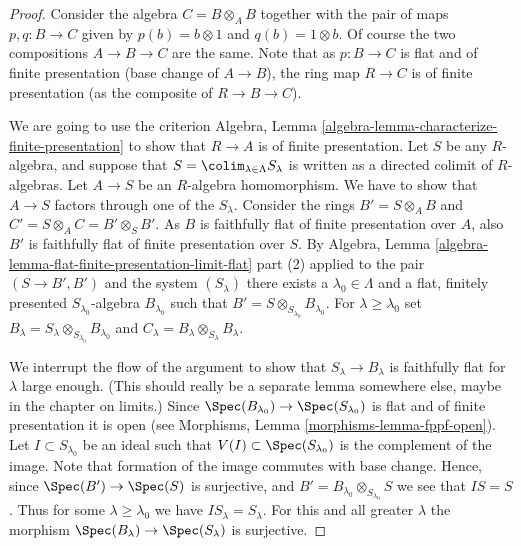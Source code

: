 \begin{proof}
Consider the algebra $C = B \otimes_A B$ together with the
pair of maps $p, q : B \to C$ given by $p(b) = b \otimes 1$
and $q(b) = 1 \otimes b$. Of course the two compositions
$A \to B \to C$ are the same. Note that as
$p : B \to C$ is flat and of finite presentation (base change of
$A \to B$), the ring map $R \to C$ is of finite presentation
(as the composite of $R \to B \to C$).

\medskip\noindent
We are going to use the criterion
Algebra, Lemma \ref{algebra-lemma-characterize-finite-presentation}
to show that $R \to A$ is of finite presentation.
Let $S$ be any $R$-algebra, and suppose that
$S = \colim_{\lambda \in \Lambda} S_\lambda$ is written
as a directed colimit of $R$-algebras.
Let $A \to S$ be an $R$-algebra homomorphism. We have to
show that $A \to S$ factors through one of the $S_\lambda$.
Consider the rings $B' = S \otimes_A B$ and
$C' = S \otimes_A C = B' \otimes_S B'$.
As $B$ is faithfully flat of finite presentation over $A$, also $B'$
is faithfully flat of finite presentation over $S$.
By Algebra, Lemma \ref{algebra-lemma-flat-finite-presentation-limit-flat}
part (2) applied to the pair $(S \to B', B')$ and the system $(S_\lambda)$
there exists a $\lambda_0 \in \Lambda$
and a flat, finitely presented $S_{\lambda_0}$-algebra
$B_{\lambda_0}$ such that $B' = S \otimes_{S_{\lambda_0}} B_{\lambda_0}$.
For $\lambda \geq \lambda_0$ set
$B_\lambda = S_\lambda \otimes_{S_{\lambda_0}} B_{\lambda_0}$ and
$C_\lambda = B_\lambda \otimes_{S_\lambda} B_\lambda$.

\medskip\noindent
We interrupt the flow of the argument to show that $S_\lambda \to B_\lambda$
is faithfully flat for $\lambda$ large enough. (This should really
be a separate lemma somewhere else, maybe in the chapter on limits.)
Since $\Spec(B_{\lambda_0}) \to \Spec(S_{\lambda_0})$ is
flat and of finite presentation it is open (see Morphisms,
Lemma \ref{morphisms-lemma-fppf-open}).
Let $I \subset S_{\lambda_0}$ be an ideal such that
$V(I) \subset \Spec(S_{\lambda_0})$ is the complement
of the image. Note that formation of the image commutes
with base change. Hence, since $\Spec(B') \to \Spec(S)$
is surjective, and $B' = B_{\lambda_0} \otimes_{S_{\lambda_0}} S$
we see that $IS = S$. Thus for some $\lambda \geq \lambda_0$ we
have $IS_{\lambda} = S_\lambda$. For this and all greater
$\lambda$ the morphism
$\Spec(B_\lambda) \to \Spec(S_\lambda)$ is surjective.


\end{proof}
